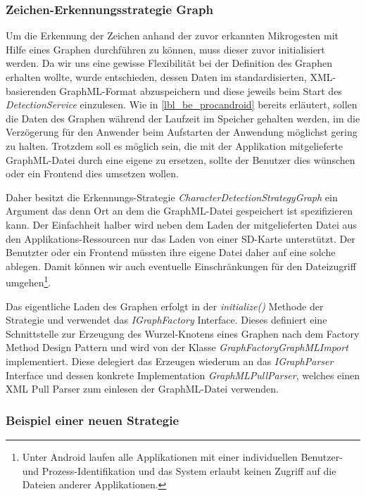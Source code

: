 \subsubsection{Zeichen-Erkennungsstrategie Graph}

Um die Erkennung der Zeichen anhand der zuvor erkannten Mikrogesten mit Hilfe eines Graphen durchführen zu können, muss dieser zuvor initialisiert werden. Da wir uns eine gewisse Flexibilität bei der Definition des Graphen erhalten wollte, wurde entschieden, dessen Daten im standardisierten, XML-basierenden GraphML-Format abzuspeichern und diese jeweils beim Start des \emph{DetectionService} einzulesen. Wie in \ref{lbl_be_procandroid} bereits erläutert, sollen die Daten des Graphen während der Laufzeit im Speicher gehalten werden, im die Verzögerung für den Anwender beim Aufstarten der Anwendung möglichst gering zu halten. Trotzdem soll es möglich sein, die mit der Applikation mitgelieferte GraphML-Datei durch eine eigene zu ersetzen, sollte der Benutzer dies wünschen oder ein Frontend dies umsetzen wollen.

Daher besitzt die Erkennungs-Strategie \emph{CharacterDetectionStrategyGraph} ein Argument das denn Ort an dem die GraphML-Datei gespeichert ist spezifizieren kann. Der Einfachheit halber wird neben dem Laden der mitgelieferten Datei aus den Applikations-Ressourcen nur das Laden von einer SD-Karte unterstützt. Der Benutzter oder ein Frontend müssten ihre eigene Datei daher auf eine solche ablegen. Damit können wir auch eventuelle Einschränkungen für den Dateizugriff umgehen\footnote{Unter Android laufen alle Applikationen mit einer individuellen Benutzer- und Prozess-Identifikation und das System erlaubt keinen Zugriff auf die Dateien anderer Applikationen.}.

Das eigentliche Laden des Graphen erfolgt in der \emph{initialize()} Methode der Strategie und verwendet das \emph{IGraphFactory} Interface. Dieses definiert eine Schnittstelle zur Erzeugung des Wurzel-Knotens eines Graphen nach dem Factory Method Design Pattern\cite[S.107-116]{designpatterns} und wird von der Klasse \emph{GraphFactoryGraphMLImport} implementiert. Diese delegiert das Erzeugen wiederum an das \emph{IGraphParser} Interface und dessen konkrete Implementation \emph{GraphMLPullParser}, welches einen XML Pull Parser zum einlesen der GraphML-Datei verwenden.

\subsubsection{Beispiel einer neuen Strategie}

